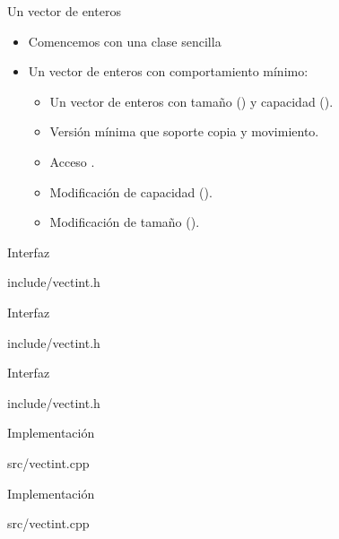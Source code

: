 \begin{frame}[t]{Un vector de enteros}
\begin{itemize}
  \item Comencemos con una clase sencilla
  \item Un vector de enteros con comportamiento mínimo:
    \begin{itemize}
      \item Un vector de enteros con tamaño () y capacidad ().
      \item Versión mínima que soporte copia y movimiento.
      \item Acceso .
      \item Modificación de capacidad (). 
      \item Modificación de tamaño (). 
    \end{itemize}
\end{itemize}
\end{frame}

\begin{frame}[t]{Interfaz}
\begin{block}{include/vectint.h}

\end{block}
\end{frame}

\begin{frame}[t]{Interfaz}
\begin{block}{include/vectint.h}

\end{block}
\end{frame}

\begin{frame}[t]{Interfaz}
\begin{block}{include/vectint.h}

\end{block}
\end{frame}

\begin{frame}[t]{Implementación}
\begin{block}{src/vectint.cpp}

\end{block}
\end{frame}

\begin{frame}[t]{Implementación}
\begin{block}{src/vectint.cpp}

\end{block}
\end{frame}

